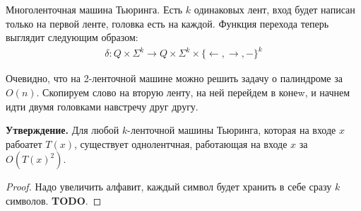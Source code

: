 \begin{conj}
    Многоленточная машина Тьюринга. Есть $k$ одинаковых лент, вход будет написан только на первой ленте, головка есть на каждой. 
    Функция перехода теперь выглядит следующим образом:
    \begin{gather*}
      \delta: Q \times \Sigma^k \to Q \times \Sigma^k \times \{\leftarrow, \rightarrow, -\}^k
    \end{gather*}
\end{conj}
 
Очевидно, что на 2-ленточной машине можно решить задачу о палиндроме за $O(n)$. Скопируем слово на вторую ленту, на ней перейдем в конеw, и начнем идти двумя головками навстречу друг другу.
 
\textbf{Утверждение.} Для любой $k$-ленточной машины Тьюринга, которая на входе $x$ рабоатет $T(x)$, существует однолентчная, работающая на входе $x$ за $O(T(x)^2)$. 
\begin{proof}
  Надо увеличить алфавит, каждый символ будет хранить в себе сразу $k$ символов. \textbf{TODO}.
\end{proof}
 
